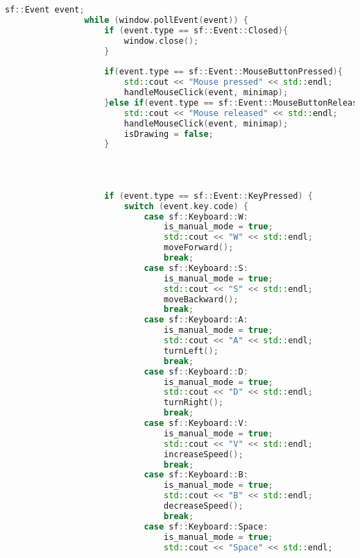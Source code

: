 \begin{lstlisting}[language={C++}, caption={Primer ajuste de c\'odigo}, label={Script}]
                sf::Event event;
                while (window.pollEvent(event)) {
                    if (event.type == sf::Event::Closed){
                        window.close();
                    }
        
                    if(event.type == sf::Event::MouseButtonPressed){
                        std::cout << "Mouse pressed" << std::endl;
                        handleMouseClick(event, minimap);
                    }else if(event.type == sf::Event::MouseButtonReleased){
                        std::cout << "Mouse released" << std::endl;
                        handleMouseClick(event, minimap);
                        isDrawing = false;
                    }
                    
        
        
        
                    if (event.type == sf::Event::KeyPressed) {
                        switch (event.key.code) {
                            case sf::Keyboard::W:
                                is_manual_mode = true;
                                std::cout << "W" << std::endl;
                                moveForward();
                                break;
                            case sf::Keyboard::S:
                                is_manual_mode = true;
                                std::cout << "S" << std::endl;
                                moveBackward();
                                break;
                            case sf::Keyboard::A:
                                is_manual_mode = true;
                                std::cout << "A" << std::endl;
                                turnLeft();
                                break;
                            case sf::Keyboard::D:
                                is_manual_mode = true;
                                std::cout << "D" << std::endl;
                                turnRight();
                                break;
                            case sf::Keyboard::V:
                                is_manual_mode = true;
                                std::cout << "V" << std::endl;
                                increaseSpeed();
                                break;
                            case sf::Keyboard::B:
                                is_manual_mode = true;
                                std::cout << "B" << std::endl;
                                decreaseSpeed();
                                break;
                            case sf::Keyboard::Space:
                                is_manual_mode = true;
                                std::cout << "Space" << std::endl;

\end{lstlisting}
